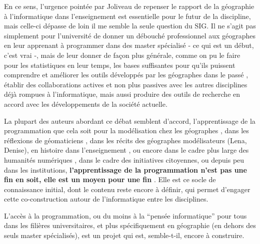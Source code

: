 
En ce sens, l'urgence pointée par Joliveau de repenser le rapport de la géographie à l'informatique dans l'enseignement est essentielle pour le futur de la discipline, mais celle-ci dépasse de loin il me semble la seule question du SIG. Il ne s'agit pas simplement pour l'université de donner un débouché professionnel aux géographes en leur apprenant à programmer dans des master spécialisé - ce qui est un début, c'est vrai -, mais de leur donner de façon plus générale, comme on pu le faire pour les statistiques en leur temps, les bases suffisantes pour qu'ils puissent comprendre et améliorer les outils développés par les géographes dans le passé , établir des collaborations actives et non plus passives avec les autres disciplines déjà rompues à l'informatique, mais aussi produire des outils de recherche en accord avec les développements de la société actuelle.

La plupart des auteurs abordant ce débat semblent d'accord, l'apprentissage de la programmation que cela soit pour la modélisation chez les géographes \autocite[64]{Banos2013}, dans les réflexions de géomaticiens \autocite{Joliveau2004}, dans les récits des géographes modélisateurs (Lena, Denise), en histoire dans l'enseignement \autocite{Genet1993}, ou encore dans le cadre plus large des humanités numériques , dans le cadre des initiatives citoyennes, ou depuis peu dans les institutions, \textbf{l'apprentissage de la programmation n'est pas une fin en soit, elle est un moyen pour une fin} \textcite[67]{Plantin2014}. Elle est ce socle de connaissance initial, dont le contenu reste encore à définir, qui permet d'engager cette co-construction autour de l'informatique entre les disciplines.

L'accès à la programmation, ou du moins à la \enquote{pensée informatique} pour tous dans les filières universitaires, et plus spécifiquement en géographie (en dehors des seuls master spécialisés), est un projet qui est, semble-t-il, encore à construire.



